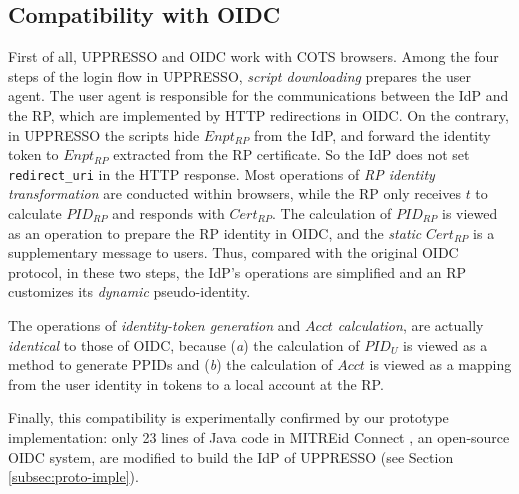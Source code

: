 \subsection{Compatibility with OIDC}
\label{subsec:compatible}
First of all, UPPRESSO and OIDC work with COTS browsers.
Among the four steps of the login flow in UPPRESSO,
    \emph{script downloading} prepares the user agent.
The user agent is responsible for the communications between the IdP and the RP,
    which are implemented by HTTP redirections in OIDC.
On the contrary, in UPPRESSO the scripts hide $Enpt_{RP}$ from the IdP,
    and forward the identity token to $Enpt_{RP}$ extracted from the RP certificate.
So the IdP does not set \verb+redirect_uri+ in the HTTP response. %
Most operations of \emph{RP identity transformation} are conducted within browsers,
 while the RP only receives $t$ to calculate $PID_{RP}$ and responds with  $Cert_{RP}$.
The calculation of $PID_{RP}$ is viewed as an operation to prepare the RP identity in OIDC,
    and the \emph{static} $Cert_{RP}$ is a supplementary message to users.
Thus, compared with the original OIDC protocol, in these two steps, the IdP's operations are simplified
    and an RP customizes its \emph{dynamic} pseudo-identity.

The operations of \emph{identity-token generation} and \emph{$Acct$ calculation},
    are actually \emph{identical} to those of OIDC,
    because (\emph{a}) the calculation of $PID_U$ is viewed as a method to generate PPIDs
        and (\emph{b}) the calculation of $Acct$ is viewed as a mapping from the user identity in tokens
                    to a local account at the RP.

Finally,
    this compatibility is experimentally confirmed by our prototype implementation:
     only 23 lines of Java code in MITREid Connect \cite{MITREid}, an open-source OIDC system,
 are modified
    to build the IdP of UPPRESSO (see Section \ref{subsec:proto-imple}).


